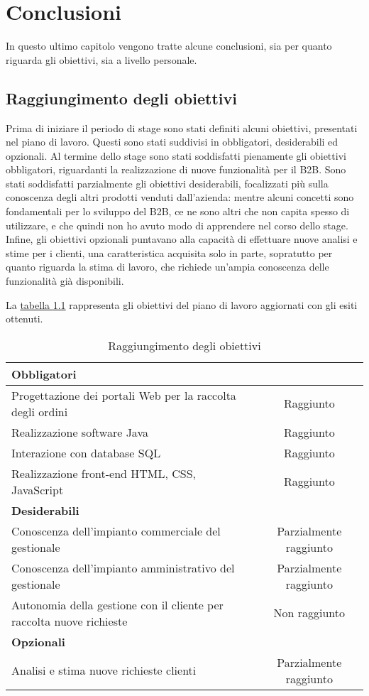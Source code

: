 \chapter{Conclusioni}
\begin{flushright}
	\parbox{13cm}{\small In questo ultimo capitolo vengono tratte alcune conclusioni, sia per quanto riguarda gli obiettivi, sia a livello personale.}
\end{flushright}
\section{Raggiungimento degli obiettivi}
Prima di iniziare il periodo di stage sono stati definiti alcuni obiettivi, presentati nel piano di lavoro. Questi sono stati suddivisi in obbligatori, desiderabili ed opzionali. Al termine dello stage sono stati soddisfatti pienamente gli obiettivi obbligatori, riguardanti la realizzazione di nuove funzionalità per il B2B. Sono stati soddisfatti parzialmente gli obiettivi desiderabili, focalizzati più sulla conoscenza degli altri prodotti venduti dall'azienda: mentre alcuni concetti sono fondamentali per lo sviluppo del B2B, ce ne sono altri che non capita spesso di utilizzare, e che quindi non ho avuto modo di apprendere nel corso dello stage. Infine, gli obiettivi opzionali puntavano alla capacità di effettuare nuove analisi e stime per i clienti, una caratteristica acquisita solo in parte, sopratutto per quanto riguarda la stima di lavoro, che richiede un'ampia conoscenza delle funzionalità già disponibili.

La \hyperref[tab:obiettivi-2]{tabella \ref{tab:obiettivi-2}} rappresenta gli obiettivi del piano di lavoro aggiornati con gli esiti ottenuti.
\begin{table}
	\centering
	\begin{tabular}{|m{9.3cm}|c|}
		\hline
		\multicolumn{2}{|l|}{\textbf{Obbligatori}} \\
		\hline
		Progettazione dei portali Web per la raccolta degli ordini & Raggiunto \\
		\hline
		Realizzazione software Java & Raggiunto \\
		\hline
		Interazione con database SQL & Raggiunto \\
		\hline
		Realizzazione front-end HTML, CSS, JavaScript & Raggiunto \\
		\hline
		\multicolumn{2}{|l|}{\textbf{Desiderabili}}\\
		\hline
		Conoscenza dell'impianto commerciale del gestionale & Parzialmente raggiunto \\
		\hline
		Conoscenza dell'impianto amministrativo del gestionale & Parzialmente raggiunto \\
		\hline
		Autonomia della gestione con il cliente per raccolta nuove richieste & Non raggiunto \\
		\hline
		\multicolumn{2}{|l|}{\textbf{Opzionali}} \\
		\hline
		Analisi e stima nuove richieste clienti & Parzialmente raggiunto \\
		\hline
	\end{tabular}
	\caption{Raggiungimento degli obiettivi}
	\label{tab:obiettivi-2}
\end{table}

